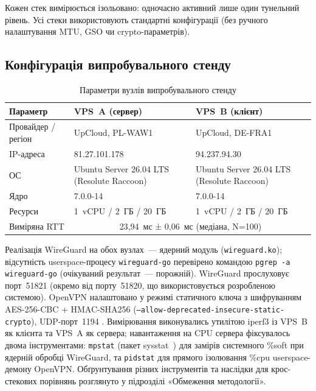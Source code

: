 Кожен стек вимірюється ізольовано: одночасно активний лише один тунельний
рівень. Усі стеки використовують стандартні конфігурації (без ручного
налаштування MTU, GSO чи crypto-параметрів).

\subsection{Конфігурація випробувального стенду}
\label{subsec:perf_setup}

\begin{table}[htbp]\centering
\caption{Параметри вузлів випробувального стенду}
\label{tab:perf_testbed}
\begin{tabularx}{\textwidth}{|l|X|X|}\hline
\textbf{Параметр} & \textbf{VPS~A (сервер)} & \textbf{VPS~B (клієнт)} \\\hline
Провайдер / регіон & UpCloud, PL-WAW1 & UpCloud, DE-FRA1 \\\hline
IP-адреса & 81.27.101.178 & 94.237.94.30 \\\hline
ОС & Ubuntu Server 26.04 LTS (Resolute Raccoon) & Ubuntu Server 26.04 LTS (Resolute Raccoon) \\\hline
Ядро & 7.0.0-14 & 7.0.0-14 \\\hline
Ресурси & 1~vCPU / 2~ГБ / 20~ГБ & 1~vCPU / 2~ГБ / 20~ГБ \\\hline
Виміряна RTT & \multicolumn{2}{c|}{23{,}94~мс ± 0{,}06~мс (медіана, N=100)} \\\hline
\end{tabularx}\end{table}

Реалізація WireGuard на обох вузлах~--- ядерний модуль
(\texttt{wireguard.ko}); відсутність userspace-процесу \texttt{wireguard-go}
перевірено командою \texttt{pgrep -a wireguard-go} (очікуваний результат~---
порожній). WireGuard прослуховує порт~51821 (окремо від порту~51820, що
використовується розробленою системою). OpenVPN налаштовано у режимі
статичного ключа з шифруванням AES-256-CBC + HMAC-SHA256
(\texttt{--allow-deprecated-insecure-static-crypto}), UDP-порт~1194
\cite{openvpn2024}. Вимірювання виконувались утилітою iperf3
\cite{iperf3} із VPS~B як клієнта та VPS~A як сервера; навантаження на CPU
сервера фіксувалось двома інструментами: \texttt{mpstat} (пакет sysstat~\cite{mpstat_sysstat})
для замірів системного \%soft при ядерній обробці WireGuard, та \texttt{pidstat}
для прямого ізолювання \%cpu userspace-демону OpenVPN. Обґрунтування різних
інструментів та наслідки для крос-стекових порівнянь розглянуто у підрозділі
«Обмеження методології».

